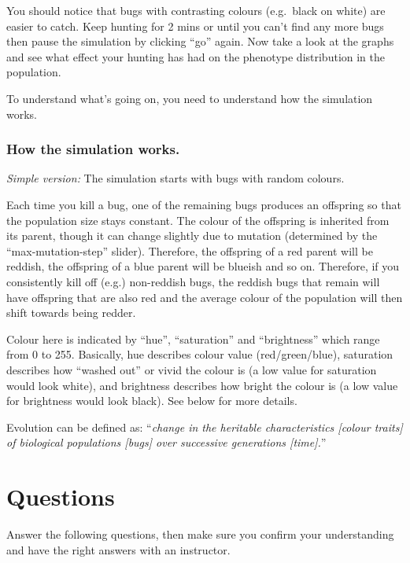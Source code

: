 \documentclass[
  a4paper]{book}
\begin{document}
You should notice that bugs with contrasting colours (e.g.~black on white) are easier to catch. Keep hunting for 2 mins or until you can't find any more bugs then pause the simulation by clicking ``go'' again. Now take a look at the graphs and see what effect your hunting has had on the phenotype distribution in the population.

To understand what's going on, you need to understand how the simulation works.

\hypertarget{how-the-simulation-works.-1}{%
\subsubsection{How the simulation works.}\label{how-the-simulation-works.-1}}

\emph{Simple version:}
The simulation starts with bugs with random colours.

Each time you kill a bug, one of the remaining bugs produces an offspring so that the population size stays constant. The colour of the offspring is inherited from its parent, though it can change slightly due to mutation (determined by the ``max-mutation-step'' slider). Therefore, the offspring of a red parent will be reddish, the offspring of a blue parent will be blueish and so on. Therefore, if you consistently kill off (e.g.) non-reddish bugs, the reddish bugs that remain will have offspring that are also red and the average colour of the population will then shift towards being redder.

Colour here is indicated by ``hue'', ``saturation'' and ``brightness'' which range from 0 to 255. Basically, hue describes colour value (red/green/blue), saturation describes how ``washed out'' or vivid the colour is (a low value for saturation would look white), and brightness describes how bright the colour is (a low value for brightness would look black). See below for more details.

Evolution can be defined as: ``\emph{change in the heritable characteristics {[}colour traits{]} of biological populations {[}bugs{]} over successive generations {[}time{]}.}''

\hypertarget{questions-1}{%
\section{Questions}\label{questions-1}}

Answer the following questions, then make sure you confirm your understanding and have the right answers with an instructor.
\end{document}
